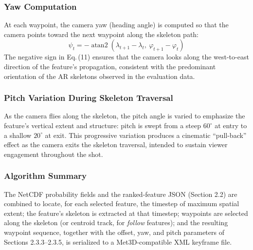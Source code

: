 \documentclass[journal abbreviation, manuscript]{copernicus}
\begin{document}
\subsubsection{Yaw Computation}
At each waypoint, the camera yaw (heading angle) is computed so that the camera points toward the next waypoint along the skeleton path:
\begin{equation}
\psi_t = -\operatorname{atan2}\!\left(\lambda_{t+1}-\lambda_t,\ \varphi_{t+1}-\varphi_t\right)
\tag{11}
\end{equation}
The negative sign in Eq.\,(11) ensures that the camera looks along the west-to-east direction of the feature's propagation, consistent with the predominant orientation of the AR skeletons observed in the evaluation data.

\subsubsection{Pitch Variation During Skeleton Traversal}
As the camera flies along the skeleton, the pitch angle is varied to emphasize the feature's vertical extent and structure: pitch is swept from a steep $60^{\circ}$ at entry to a shallow $20^{\circ}$ at exit. This progressive variation produces a cinematic ``pull-back'' effect as the camera exits the skeleton traversal, intended to sustain viewer engagement throughout the shot.

\subsubsection{Algorithm Summary}
The NetCDF probability fields and the ranked-feature JSON (Section 2.2) are combined to locate, for each selected feature, the timestep of maximum spatial extent; the feature's skeleton is extracted at that timestep; waypoints are selected along the skeleton (or centroid track, for \textit{follow} features); and the resulting waypoint sequence, together with the offset, yaw, and pitch parameters of Sections 2.3.3--2.3.5, is serialized to a Met3D-compatible XML keyframe file.

\end{document}
